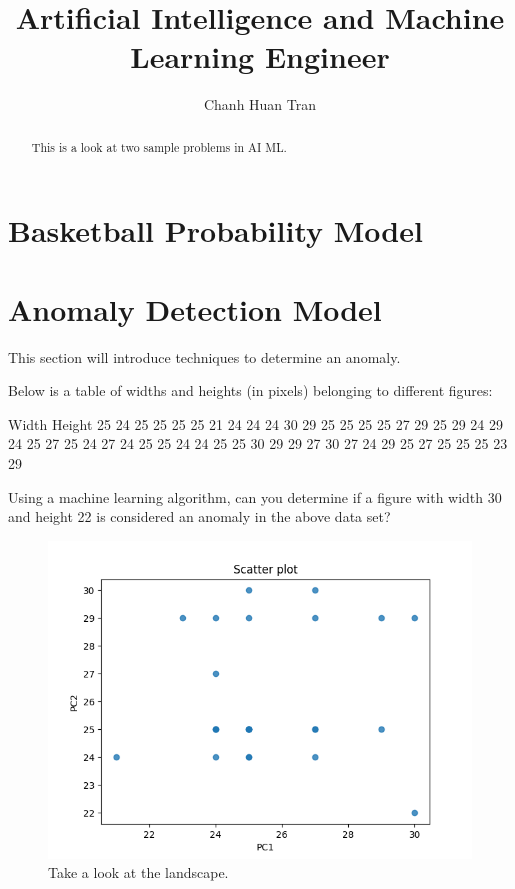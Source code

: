 \documentclass[]{scrartcl}
\title{Artificial Intelligence and Machine Learning Engineer}
\author{Chanh Huan Tran}
\begin{document}
\maketitle

\begin{abstract}
This is a look at two sample problems in AI ML.

\end{abstract}

\section{Basketball Probability Model}
\section{Anomaly Detection Model}

This section will introduce techniques to determine an anomaly.

Below is a table of widths and heights (in pixels) belonging to different figures:

Width
Height
25
24
25
25
25
25
21
24
24
24
30
29
25
25
25
25
27
29
25
29
24
29
24
25
27
25
24
27
24
25
25
24
24
25
25
30
29
29
27
30
27
24
29
25
27
25
25
25
23
29

Using a machine learning algorithm, can you determine if a figure with width 30 and height 22 is considered an anomaly in the above data set?

\begin{figure}
	\centering
	\includegraphics[width=0.7\linewidth]{Figure_1}
	\caption[Anomaly Detection Scatter Plot]{Take a look at the landscape.}
	\label{fig:figure1}
\end{figure}
\end{document}
